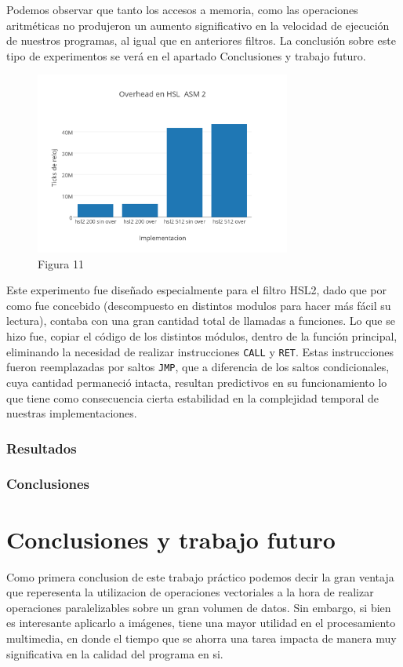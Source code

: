 \documentclass[a4paper]{article}
\begin{document}
Podemos observar que tanto los accesos a memoria, como las operaciones aritméticas no produjeron un aumento significativo en la velocidad de ejecución de nuestros programas, al igual que en anteriores filtros. La conclusión sobre este tipo de experimentos se verá en el apartado Conclusiones y trabajo futuro.

\begin{figure}[h]
  \centering
    \includegraphics[width=0.75\textwidth]{imagenes/OverheadEnHSLASM2.png}
  \caption{Figura 11}
  \label{fig:graficohsl5}
\end{figure}
 \FloatBarrier

Este experimento fue diseñado especialmente para el filtro HSL2, dado que por como fue concebido (descompuesto en distintos modulos para hacer más fácil su lectura), contaba con una gran cantidad total de llamadas a funciones. Lo que se hizo fue, copiar el código de los distintos módulos, dentro de la función principal, eliminando la necesidad de realizar instrucciones {\tt CALL} y {\tt RET}. Estas instrucciones fueron reemplazadas por saltos {\tt JMP}, que a diferencia de los saltos condicionales, cuya cantidad permaneció intacta, resultan predictivos en su funcionamiento lo que tiene como consecuencia cierta estabilidad en la complejidad temporal de nuestras implementaciones.

\subsubsection{Resultados}

\subsubsection{Conclusiones}


\newpage
\section{Conclusiones y trabajo futuro}
Como primera conclusion de este trabajo práctico podemos decir la gran ventaja que reperesenta la utilizacion de operaciones vectoriales a la hora de realizar operaciones paralelizables sobre un gran volumen de datos. Sin embargo, si bien es interesante aplicarlo a imágenes, tiene una mayor utilidad en el procesamiento multimedia, en donde el tiempo que se ahorra una tarea impacta de manera muy significativa en la calidad del programa en si.
\end{document}

